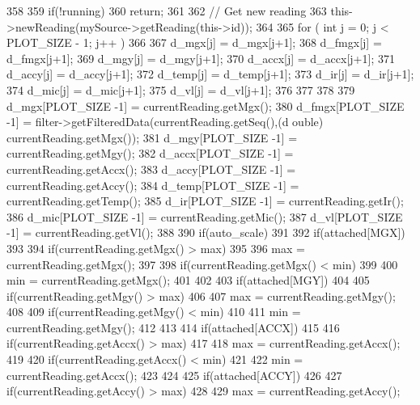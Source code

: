 \begin{DoxyCode}
358 {
359     if(!running)
360         return;
361 
362     // Get new reading
363     this->newReading(mySource->getReading(this->id));
364 
365         for ( int j = 0; j < PLOT_SIZE - 1; j++ )
366         {
367             d_mgx[j] = d_mgx[j+1];
368             d_fmgx[j] = d_fmgx[j+1];
369             d_mgy[j] = d_mgy[j+1];
370             d_accx[j] = d_accx[j+1];
371             d_accy[j] = d_accy[j+1];
372             d_temp[j] = d_temp[j+1];
373             d_ir[j] = d_ir[j+1];
374             d_mic[j] = d_mic[j+1];
375             d_vl[j] = d_vl[j+1];
376         }
377 
378 
379         d_mgx[PLOT_SIZE -1] = currentReading.getMgx();
380         d_fmgx[PLOT_SIZE -1] = filter->getFilteredData(currentReading.getSeq(),(d
      ouble) currentReading.getMgx());
381         d_mgy[PLOT_SIZE -1] = currentReading.getMgy();
382         d_accx[PLOT_SIZE -1] = currentReading.getAccx();
383         d_accy[PLOT_SIZE -1] = currentReading.getAccy();
384         d_temp[PLOT_SIZE -1] = currentReading.getTemp();
385         d_ir[PLOT_SIZE -1] = currentReading.getIr();
386         d_mic[PLOT_SIZE -1] = currentReading.getMic();
387         d_vl[PLOT_SIZE -1] = currentReading.getVl();
388 
390         if(auto_scale)
391         {
392             if(attached[MGX])
393             {
394                 if(currentReading.getMgx() > max)
395                 {
396                     max = currentReading.getMgx();
397                 }
398                 if(currentReading.getMgx() < min)
399                 {
400                     min = currentReading.getMgx();
401                 }
402             }
403             if(attached[MGY])
404             {
405                 if(currentReading.getMgy() > max)
406                 {
407                     max = currentReading.getMgy();
408                 }
409                 if(currentReading.getMgy() < min)
410                 {
411                     min = currentReading.getMgy();
412                 }
413             }
414             if(attached[ACCX])
415             {
416                 if(currentReading.getAccx() > max)
417                 {
418                     max = currentReading.getAccx();
419                 }
420                 if(currentReading.getAccx() < min)
421                 {
422                     min = currentReading.getAccx();
423                 }
424             }
425             if(attached[ACCY])
426             {
427                 if(currentReading.getAccy() > max)
428                 {
429                     max = currentReading.getAccy();
}}}}
\end{DoxyCode}
